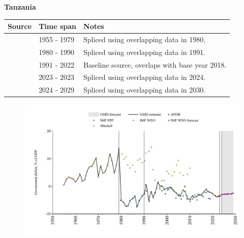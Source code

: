 \documentclass[12pt,a4paper,landscape]{article}
\begin{document}
\begin{adjustbox}{max totalsize={\paperwidth}{\paperheight},center}
\begin{minipage}[t][\textheight][t]{\textwidth}
\vspace*{0.5cm}
{}
\begin{center}
{\Large\bfseries Tanzania}
\end{center}
\vspace{0.5cm}
\begin{table}[H]
\centering
\small
\begin{tabular}{|l|l|l|}
\hline
\textbf{Source} & \textbf{Time span} & \textbf{Notes} \\
\hline
\rowcolor{white}\cite{Mitchell}& 1955 - 1979 &Spliced using overlapping data in 1980.\\
\rowcolor{lightgray}\cite{AFDB}& 1980 - 1990 &Spliced using overlapping data in 1991.\\
\rowcolor{white}\cite{IMF_WEO}& 1991 - 2022 &Baseline source, overlaps with base year 2018.\\
\rowcolor{lightgray}\cite{IMF_FPP}& 2023 - 2023 &Spliced using overlapping data in 2024.\\
\rowcolor{white}\cite{IMF_WEO_forecast}& 2024 - 2029 &Spliced using overlapping data in 2030.\\
\hline
\end{tabular}
\end{table}
\begin{figure}[H]
\centering
\includegraphics[width=\textwidth,height=0.6\textheight,keepaspectratio]{graphs/TZA_govdef_GDP.pdf}
\end{figure}
\end{minipage}
\end{adjustbox}
\end{document}
